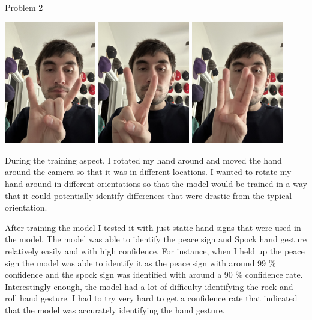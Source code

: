 \begin{problem}{Problem 2}
\begin{highlight}[Solution]
        \begin{center}
            \includegraphics[width = 0.30\textwidth]{./Images/Model 2/Training Images/Rock And Roll.jpg}
            \hspace*{10pt}
            \includegraphics[width = 0.30\textwidth]{./Images/Model 2/Training Images/Peace Sign.jpg}
            \hspace*{10pt}
            \includegraphics[width = 0.30\textwidth]{./Images/Model 2/Training Images/Spock.jpg}
        \end{center}

        During the training aspect, I rotated my hand around and moved the hand around the camera so that it was in different locations. I wanted to rotate my hand around in different orientations
        so that the model would be trained in a way that it could potentially identify differences that were drastic from the typical orientation.

        After training the model I tested it with just static hand signs that were used in the model. The model was able to identify the peace sign and Spock hand gesture relatively easily and with
        high confidence. For instance, when I held up the peace sign the model was able to identify it as the peace sign with around 99 \% confidence and the spock sign was identified with around a
        90 \% confidence rate. Interestingly enough, the model had a lot of difficulty identifying the rock and roll hand gesture. I had to try very hard to get a confidence rate that indicated that
        the model was accurately identifying the hand gesture.


\end{highlight}
\end{problem}
